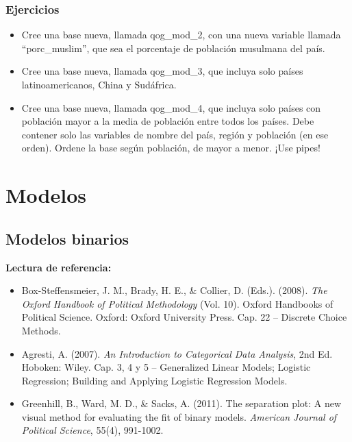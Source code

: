 \documentclass[]{book}
\providecommand{\tightlist}{%
  \setlength{\itemsep}{0pt}\setlength{\parskip}{0pt}}
\begin{document}
\section{Ejercicios}\label{ejercicios-1}

\begin{itemize}
\tightlist
\item
  Cree una base nueva, llamada qog\_mod\_2, con una nueva variable
  llamada ``porc\_muslim'', que sea el porcentaje de población musulmana
  del país.
\item
  Cree una base nueva, llamada qog\_mod\_3, que incluya solo países
  latinoamericanos, China y Sudáfrica.
\item
  Cree una base nueva, llamada qog\_mod\_4, que incluya solo países con
  población mayor a la media de población entre todos los países. Debe
  contener solo las variables de nombre del país, región y población (en
  ese orden). Ordene la base según población, de mayor a menor. ¡Use
  pipes!
\end{itemize}

\part{Modelos}\label{part-modelos}

\chapter{Modelos binarios}\label{bin}

\begin{books}
\textbf{Lectura de referencia:}

\begin{itemize}
\tightlist
\item
  Box-Steffensmeier, J. M., Brady, H. E., \& Collier, D. (Eds.). (2008).
  \emph{The Oxford Handbook of Political Methodology} (Vol. 10). Oxford
  Handbooks of Political Science. Oxford: Oxford University Press. Cap.
  22 -- Discrete Choice Methods.
\item
  Agresti, A. (2007). \emph{An Introduction to Categorical Data
  Analysis}, 2nd Ed. Hoboken: Wiley. Cap. 3, 4 y 5 -- Generalized Linear
  Models; Logistic Regression; Building and Applying Logistic Regression
  Models.
\item
  Greenhill, B., Ward, M. D., \& Sacks, A. (2011). The separation plot:
  A new visual method for evaluating the fit of binary models.
  \emph{American Journal of Political Science}, 55(4), 991-1002.
\end{itemize}
\end{books}
\end{document}
